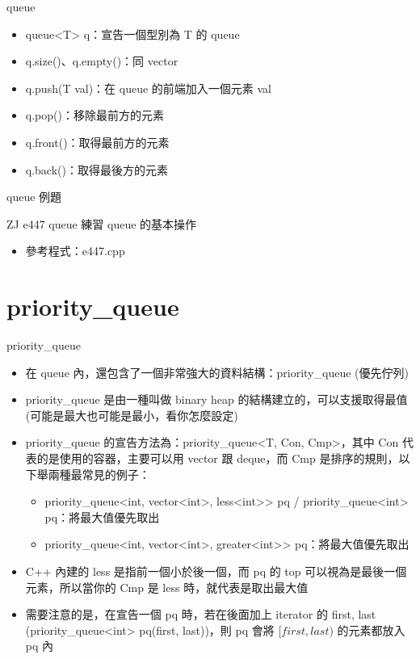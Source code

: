 \documentclass[aspectratio=169]{beamer}
\begin{document}
    \begin{frame}{queue}
        \begin{itemize}
            \item<1-> queue<T> q：宣告一個型別為 T 的 queue
            \item<1-> q.size()、q.empty()：同 vector
            \item<2-> q.push(T val)：在 queue 的前端加入一個元素 val
            \item<2-> q.pop()：移除最前方的元素
            \item<3-> q.front()：取得最前方的元素
            \item<3-> q.back()：取得最後方的元素
        \end{itemize}
    \end{frame}

    \begin{frame}{queue 例題}
        \begin{block}{ZJ e447 queue 練習}
            queue 的基本操作
        \end{block}

        \begin{itemize}
            \item 參考程式：e447.cpp
        \end{itemize}
    \end{frame}

    \section{priority\_queue}

    \begin{frame}{priority\_queue}
        \begin{itemize}
            \item<1-> 在 queue 內，還包含了一個非常強大的資料結構：priority\_queue (優先佇列)
            \item<2-> priority\_queue 是由一種叫做 binary heap 的結構建立的，可以支援取得最值 (可能是最大也可能是最小，看你怎麼設定)
            \item<3-> priority\_queue 的宣告方法為：priority\_queue<T, Con, Cmp>，其中 Con 代表的是使用的容器，主要可以用 vector 跟 deque，而 Cmp 是排序的規則，以下舉兩種最常見的例子：
            \begin{itemize}
                \item<4-> priority\_queue<int, vector<int>, less<int>> pq / priority\_queue<int> pq：將最大值優先取出
                \item<4-> priority\_queue<int, vector<int>, greater<int>> pq：將最大值優先取出
            \end{itemize}
            \item<5-> C++ 內建的 less 是指前一個小於後一個，而 pq 的 top 可以視為是最後一個元素，所以當你的 Cmp 是 less 時，就代表是取出最大值
            \item<6-> 需要注意的是，在宣告一個 pq 時，若在後面加上 iterator 的 first, last (priority\_queue<int> pq(first, last))，則 pq 會將 $[first, last)$ 的元素都放入 pq 內
        \end{itemize}
    \end{frame}
\end{document}
